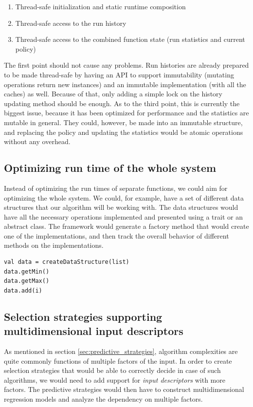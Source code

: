 \begin{enumerate}
	\item Thread-safe initialization and static runtime composition
	\item Thread-safe access to the run history
	\item Thread-safe access to the combined function state (run statistics and current policy)
\end{enumerate}

The first point should not cause any problems. Run histories are already prepared to be made thread-safe by having an API to support immutability (mutating operations return new instances) and an immutable implementation (with all the caches) as well. Because of that, only adding a simple lock on the history updating method should be enough. As to the third point, this is currently the biggest issue, because it has been optimized for performance and the statistics are mutable in general. They could, however, be made into an immutable structure, and replacing the policy and updating the statistics would be atomic operations without any overhead.

\subsection{Optimizing run time of the whole system}

Instead of optimizing the run times of separate functions, we could aim for optimizing the whole system. We could, for example, have a set of different data structures that our algorithm will be working with. The data structures would have all the necessary operations implemented and presented using a trait or an abstract class. The framework would generate a factory method that would create one of the implementations, and then track the overall behavior of different methods on the implementations. 

\lstset{style=Scala}
\begin{lstlisting}
val data = createDataStructure(list)
data.getMin()
data.getMax()
data.add(i)
\end{lstlisting}

\subsection{Selection strategies supporting multidimensional input descriptors}

As mentioned in section \ref{sec:predictive_strategies}, algorithm complexities are quite commonly functions of multiple factors of the input. In order to create selection strategies that would be able to correctly decide in case of such algorithms, we would need to add support for \textit{input descriptors} with more factors. The predictive strategies would then have to construct multidimensional regression models and analyze the dependency on multiple factors.

